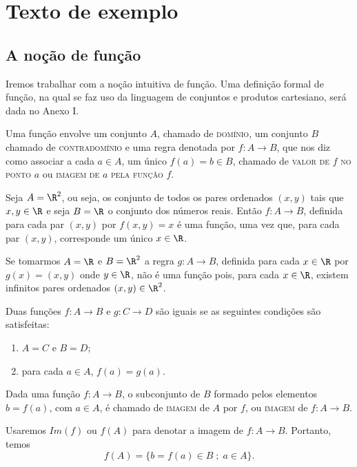 \chapter{Texto de exemplo}
\section{A no\c{c}\~ao de fun\c{c}\~ao}
\indent\indent Iremos trabalhar com a no\c{c}\~ao intuitiva de fun\c{c}\~ao.
Uma defini\c{c}\~ao formal de fun\c{c}\~ao, na qual se faz uso da linguagem de
conjuntos e produtos cartesiano, ser\'a dada no Anexo I.

Uma fun\c{c}\~ao envolve um conjunto $A$, chamado de \textsc{dom\'inio},
um conjunto $B$ chamado de \textsc{contradom\'inio} e uma regra
denotada por $f:A \rightarrow B$, que nos diz como associar a cada
$a \in A$, um \'unico $f(a)=b \in B$, chamado de \textsc{valor de}
$f$ \textsc{no ponto} $a$ ou \textsc{imagem de} $a$ \textsc{pela
fun\c{c}\~ao} $f$.
\begin{example}\label{R2emR}
Seja $A=\R^2$, ou seja, os conjunto de todos os pares ordenados
$(x,y)$ tais que $x,y \in \R$ e seja $B=\R$ o conjunto dos n\'umeros
reais. Ent\~ao $f:A \rightarrow B$, definida para cada par $(x,y)$
por $f(x,y)=x$ \'e uma fun\c{c}\~ao, uma vez que, para cada par $(x,y)$,
corresponde um \'unico $x \in \R$.
\end{example}
\begin{example}
Se tomarmos $A=\R$ e $B=\R^2$ a regra $g:A \rightarrow B$,
definida para cada $x \in \R$ por $g(x)=(x,y)$ onde $y \in \R$,
n\~ao \'e uma fun\c{c}\~ao pois, para cada $x \in \R$, existem infinitos
pares ordenados $(x,y) \in \R^2$.
\end{example}

\begin{definition}
Duas fun\c{c}\~oes $f:A \rightarrow B$ e $g:C \rightarrow D$ s\~ao iguais
se as seguintes condi\c{c}\~oes s\~ao satisfeitas:
\begin{enumerate}
    \item $A=C$ e $B=D$;
    \item para cada $a \in A$, $f(a)=g(a)$.
\end{enumerate}
\end{definition}
\begin{definition}
Dada uma fun\c{c}\~ao $f:A \rightarrow B$, o subconjunto de $B$ formado
pelos elementos $b=f(a)$, com $a \in A$, \'e chamado de
\textsc{imagem} de $A$ por $f$, ou \textsc{imagem} de $f:A
\rightarrow B$.
\end{definition}
Usaremos $Im(f)$ ou $f(A)$ para denotar a imagem de $f:A
\rightarrow B$. Portanto, temos
$$
f(A)=\{b=f(a)\in B\;;\; a \in A\}.
$$

